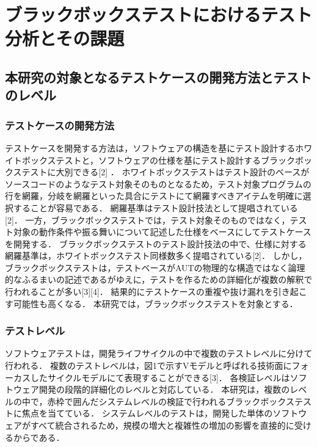 \documentclass[a4paper,12pt]{jreport}
\begin{document}
\chapter{ブラックボックステストにおけるテスト分析とその課題}
\section{本研究の対象となるテストケースの開発方法とテストのレベル}
\subsection{テストケースの開発方法}
テストケースを開発する方法は，ソフトウェアの構造を基にテスト設計するホワイトボックステストと，ソフトウェアの仕様を基にテスト設計するブラックボックステストに大別できる[2] ．
ホワイトボックステストはテスト設計のベースがソースコードのようなテスト対象そのものとなるため，テスト対象プログラムの行を網羅，分岐を網羅といった具合にテストにて網羅すべきアイテムを明確に選択することが容易である．
網羅基準はテスト設計技法として提唱されている[2]．
一方，ブラックボックステストでは，テスト対象そのものではなく，テスト対象の動作条件や振る舞いについて記述した仕様をベースにしてテストケースを開発する．
ブラックボックステストのテスト設計技法の中で、仕様に対する網羅基準は，ホワイトボックステスト同様数多く提唱されている[2]．
しかし，ブラックボックステストは，テストベースがAUTの物理的な構造ではなく論理的なふるまいの記述であるがゆえに，テストを作るための詳細化が複数の解釈で行われることが多い[3][4]．
結果的にテストケースの重複や抜け漏れを引き起こす可能性も高くなる．
本研究では，ブラックボックステストを対象とする．
\subsection{テストレベル}
ソフトウェアテストは，開発ライフサイクルの中で複数のテストレベルに分けて行われる．
複数のテストレベルは，図1で示すVモデルと呼ばれる技術面にフォーカスしたサイクルモデルにて表現することができる[3]．
各検証レベルはソフトウェア開発の段階的詳細化のレベルと対応している．
本研究は，複数のレベルの中で，赤枠で囲んだシステムレベルの検証で行われるブラックボックステストに焦点を当てている．
システムレベルのテストは，開発した単体のソフトウェアがすべて統合されるため，規模の増大と複雑性の増加の影響を直接的に受けるからである．
\end{document}
